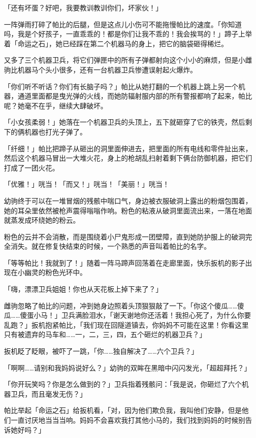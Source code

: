 「还有坏蛋？好吧，我要教训教训你们，坏家伙！」

一阵弹雨打碎了帕比的后腿，但是这点儿小伤可不能拖慢帕比的速度。「你知道吗，我是个好孩子，一直乖乖的！都是你们让我不乖的！我会挨骂的！」蹄子上举着「命运之石」，她已经踩在第二个机器马的身上，把它的脑袋砸得稀烂。

又多了三个机器卫兵，将它们弹匣中的所有子弹都射向这个小小的麻烦，但是小雌驹比机器马个头小很多，还有一台机器卫兵惨遭误射起火爆炸。

「你们听不听话？你们有长脑子吗？」帕比从她打翻的一个机器上跳上另一个机器，通道里面都是曳光弹的火线，而她防辐射服内部的所有警报都响了起来，帕比呢？她毫不在乎，继续大肆破坏。

「小女孩柔弱！」她落在一个机器卫兵的头顶上，五下就砸穿了它的铁壳，然后剩下的俩机器也打光子弹了。

「纤细！」帕比把蹄子从砸出的洞里面伸进去，把里面的所有电线和零件扯出来，然后这个机器马冒出一大堆火花，身上的枪胡乱扫射着剩下俩台防御机器，把它们打成了一团火花。

「优雅！」咣当！「而又！」咣当！「美丽！」咣当！

幼驹终于可以在一堆冒烟的残骸中喘口气，身边被衣服破洞上露出的粉烟包围着，她的耳朵里依然被枪声震得嗡嗡作响。粉色的粘液从破洞里面流出来，一落在地面就蒸发成环绕她的粉云。

粉色的云并不会消散，而是围绕着小尸鬼形成一团壁障，直到她防护服上的破洞完全消失。就在修复快结束的时候，一个熟悉的声音叫着帕比的名字。

「等等帕比！我就到了！」随着一阵马蹄声回荡着在走廊里面，快乐扳机的影子出现在小幽灵的粉色光环中。

「嗨，漂漂卫兵姐姐！你也从天花板上掉下来了？」

雌驹忽略了帕比的问题，冲到她身边照着头顶狠狠敲了一下。「你这个傻瓜……傻瓜……傻蛋小马！」卫兵满脸泪水，「谢天谢地你还活着！我担心死了，为什么你要乱跑？」扳机抱紧帕比，「我们现在回隧道镇去，你妈妈不可能在这里！你看这里只有被遗弃的马车和……一，二，三，四，五个砸烂的机器卫兵？」

扳机眨了眨眼，被吓了一跳，「你……独自解决了……六个卫兵？」

「啊啊……请别和我妈妈说好么？」幼驹的双眸在黑暗中闪闪发光，「超超拜托？」

「你开玩笑吗？你是怎么做到的？」卫兵指着残骸问：「我是说，你砸烂了六个机器卫兵，而且毫发无伤？」

帕比举起「命运之石」给扳机看，「对，因为他们欺负我，我叫他们安静，但是他们一直讨厌地当当当响。妈妈不会喜欢我打其他小马的，我们找到妈妈的时候别告诉她好吗？」

